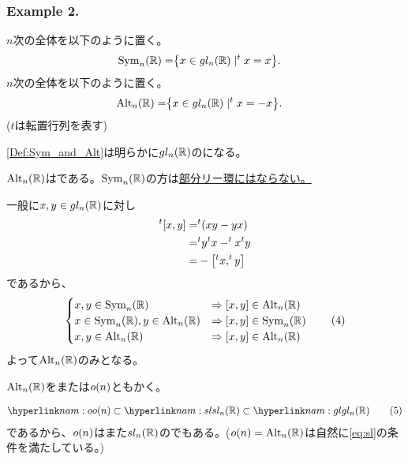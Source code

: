 \documentclass[fleqn,twocolumn,titlepage,dvipdfmx]{jsarticle}
\begin{document}
\subsubsection*{Example 2.}
\begin{definition}\label{Def:Sym_and_Alt}
  $n$次の全体を以下のように置く。
  \begin{align*}
    \operatorname{Sym}_{n}(\mathbb{R}) =& \qty{x\in gl_{n}(\mathbb{R})\mid ^{t}x=x}.
  \end{align*}
  $n$次の全体を以下のように置く。
  \begin{align*}
    \operatorname{Alt}_{n}(\mathbb{R}) =& \qty{x\in gl_{n}(\mathbb{R})\mid ^{t}x=-x}.
  \end{align*}
  ($t$は転置行列を表す)
\end{definition}
\begin{remark}
  \cref{Def:Sym_and_Alt}は明らかに$gl_{n}(\mathbb{R})$の{}になる。
\end{remark}
\begin{theorem}
  $\operatorname{Alt}_{n}(\mathbb{R})$は{}である。$\operatorname{Sym}_{n}(\mathbb{R})$の方は\underline{部分リー環にはならない。}
\end{theorem}
\begin{Proof}
  一般に$x,y\in gl_{n}(\mathbb{R})$に対し
  \begin{align*}
    ^{t}\comm{x}{y} =& ^{t}\qty(xy-yx)\\
    =& ^{t}y^{t}x-^t{x}^t{y}\\
    =& -\comm{^{t}x}{^{t}y}
  \end{align*}
  であるから、
  \begin{align*}
    \begin{cases}
      x,y\in\Sym_{n}(\R) &\Rightarrow \comm{x}{y}\in\Alt_{n}(\R)\\
      x\in\Sym_{n}(\R),y\in\Alt_{n}(\R) &\Rightarrow \comm{x}{y}\in\Sym_{n}(\R)\\
      x,y\in\Alt_{n}(\R) &\Rightarrow \comm{x}{y}\in\Alt_{n}(\R)
    \end{cases}
    \tag{4}\label{eq:2_(4)}
  \end{align*}
  よって$\operatorname{Alt}_{n}(\mathbb{R})$のみ{}となる。
\end{Proof}
\begin{named}
  $\operatorname{Alt}_{n}(\mathbb{R})$をまたは$o(n)$ともかく。
\end{named}
\begin{remark}
  \begin{align*}
    \hlin{nam:o}{\o(n)}\subset \hlin{nam:sl}{\sl_{n}(\R)} \subset \hlin{nam:gl}{\gl_{n}(\R)} \tag{5}\label{eq:2_(5)}
  \end{align*}
  であるから、$o(n)$はまた$sl_{n}(\mathbb{R})$の{}でもある。($o(n)=\operatorname{Alt}_{n}(\mathbb{R})$は自然に\eqref{eq:sl}の条件を満たしている。)
\end{remark}
\end{document}
